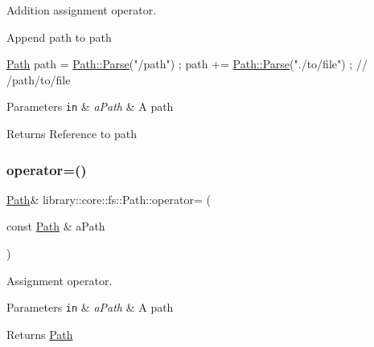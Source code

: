 Addition assignment operator. 

Append path to path


\begin{DoxyCode}
\hyperlink{classlibrary_1_1core_1_1fs_1_1_path_aaba9a8e0153813f08f78f1c3275734a4}{Path} path = \hyperlink{classlibrary_1_1core_1_1fs_1_1_path_aebf5bd3af83e0b7376616e146f3e55df}{Path::Parse}(\textcolor{stringliteral}{"/path"}) ;
path += \hyperlink{classlibrary_1_1core_1_1fs_1_1_path_aebf5bd3af83e0b7376616e146f3e55df}{Path::Parse}(\textcolor{stringliteral}{"./to/file"}) ; \textcolor{comment}{// /path/to/file}
\end{DoxyCode}



\begin{DoxyParams}[1]{Parameters}
\mbox{\tt in}  & {\em a\+Path} & A path \\
\hline
\end{DoxyParams}
\begin{DoxyReturn}{Returns}
Reference to path 
\end{DoxyReturn}
\mbox{\label{classlibrary_1_1core_1_1fs_1_1_path_a138827134fbe96f732c5708a6a331f89}} 
\subsubsection{\texorpdfstring{operator=()}{operator=()}}
{\footnotesize\ttfamily \hyperlink{classlibrary_1_1core_1_1fs_1_1_path}{Path}\& library\+::core\+::fs\+::\+Path\+::operator= (\begin{DoxyParamCaption}\item[{const \hyperlink{classlibrary_1_1core_1_1fs_1_1_path}{Path} \&}]{a\+Path }\end{DoxyParamCaption})}



Assignment operator. 


\begin{DoxyParams}[1]{Parameters}
\mbox{\tt in}  & {\em a\+Path} & A path \\
\hline
\end{DoxyParams}
\begin{DoxyReturn}{Returns}
\hyperlink{classlibrary_1_1core_1_1fs_1_1_path}{Path} 
\end{DoxyReturn}
\mbox{\label{classlibrary_1_1core_1_1fs_1_1_path_add705556eb4509ab2868e322490a1e35}} 
